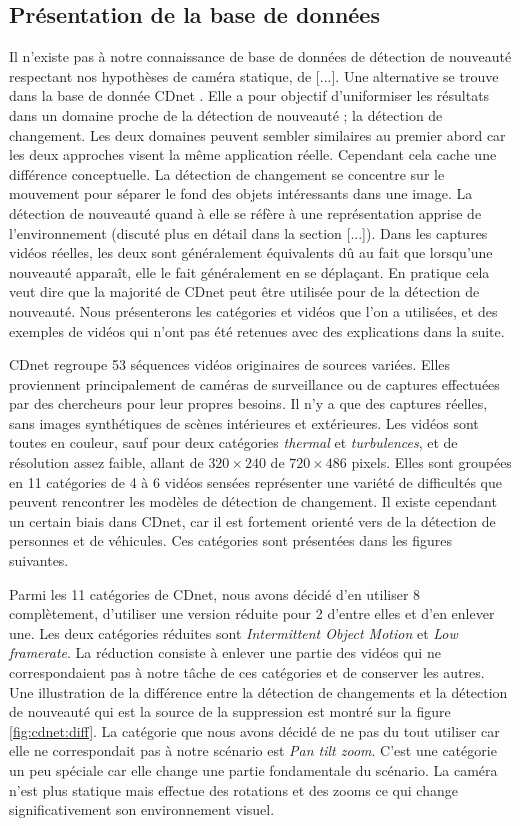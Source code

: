 	\subsection{Présentation de la base de données}

	Il n'existe pas à notre connaissance de base de données de détection de nouveauté respectant nos hypothèses de caméra statique, de [...]. Une alternative se trouve dans la base de donnée CDnet \cite{wang-cdnet}. Elle a pour objectif d'uniformiser les résultats dans un domaine proche de la détection de nouveauté ; la détection de changement. Les deux domaines peuvent sembler similaires au premier abord car les deux approches visent la même application réelle. Cependant cela cache une différence conceptuelle. La détection de changement se concentre sur le mouvement pour séparer le fond des objets intéressants dans une image. La détection de nouveauté quand à elle se réfère à une représentation apprise de l'environnement (discuté plus en détail dans la section [...]). Dans les captures vidéos réelles, les deux sont généralement équivalents dû au fait que lorsqu'une nouveauté apparaît, elle le fait généralement en se déplaçant. En pratique cela veut dire que la majorité de CDnet peut être utilisée pour de la détection de nouveauté. Nous présenterons les catégories et vidéos que l'on a utilisées, et des exemples de vidéos qui n'ont pas été retenues avec des explications dans la suite.
	
	CDnet regroupe 53 séquences vidéos originaires de sources variées. Elles proviennent principalement de caméras de surveillance ou de captures effectuées par des chercheurs pour leur propres besoins. Il n'y a que des captures réelles, sans images synthétiques de scènes intérieures et extérieures. Les vidéos sont toutes en couleur, sauf pour deux catégories \textit{thermal} et \textit{turbulences}, et de résolution assez faible, allant de $320 \times 240$ de $720 \times 486$ pixels. Elles sont groupées en 11 catégories de 4 à 6 vidéos sensées représenter une variété de difficultés que peuvent rencontrer les modèles de détection de changement. Il existe cependant un certain biais dans CDnet, car il est fortement orienté vers de la détection de personnes et de véhicules. Ces catégories sont présentées dans les figures suivantes.

	Parmi les 11 catégories de CDnet, nous avons décidé d'en utiliser 8 complètement, d'utiliser une version réduite pour 2 d'entre elles et d'en enlever une. Les deux catégories réduites sont \textit{Intermittent Object Motion} et \textit{Low framerate}. La réduction consiste à enlever une partie des vidéos qui ne correspondaient pas à notre tâche de ces catégories et de conserver les autres. Une illustration de la différence entre la détection de changements et la détection de nouveauté qui est la source de la suppression est montré sur la figure \ref{fig:cdnet:diff}. La catégorie que nous avons décidé de ne pas du tout utiliser car elle ne correspondait pas à notre scénario est \textit{Pan tilt zoom}. C'est une catégorie un peu spéciale car elle change une partie fondamentale du scénario. La caméra n'est plus statique mais effectue des rotations et des zooms ce qui change significativement son environnement visuel.


